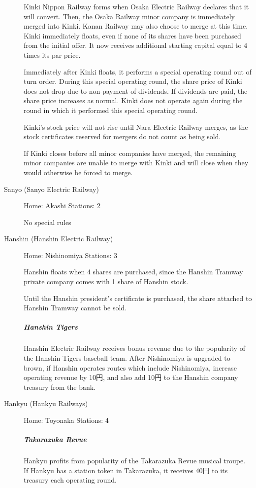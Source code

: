 \begin{multicols}{2}
\begin{description}
Kinki Nippon Railway forms when Osaka Electric Railway declares that
it will convert. Then, the Osaka Railway minor company is immediately
merged into Kinki. Kanan Railway may also choose to merge at this
time. Kinki immediately floats, even if none of its shares have been
purchased from the initial offer. It now receives additional starting
capital equal to 4 times its par price.

Immediately after Kinki floats, it performs a special operating round
out of turn order. During this special operating round, the share
price of Kinki does not drop due to non-payment of dividends. If
dividends are paid, the share price increases as normal. Kinki does
not operate again during the round in which it performed this special
operating round.

Kinki's stock price will not rise until Nara Electric Railway merges,
as the stock certificates reserved for mergers do not count as being
sold.

If Kinki closes before all minor companies have merged, the remaining
minor companies are unable to merge with Kinki and will close when they would
otherwise be forced to merge.

\item[Sanyo (Sanyo Electric Railway)] \hfill

Home: Akashi \hfill Stations: 2

No special rules

\item[Hanshin (Hanshin Electric Railway)] \hfill

Home: Nishinomiya \hfill Stations: 3

Hanshin floats when 4 shares are purchased, since the Hanshin Tramway
private company comes with 1 share of Hanshin stock.

Until the Hanshin president's certificate is purchased, the share
attached to Hanshin Tramway cannot be sold.

\subparagraph{Hanshin Tigers}
Hanshin Electric Railway receives bonus revenue due to the popularity
of the Hanshin Tigers baseball team. After Nishinomiya is upgraded to
brown, if Hanshin operates routes which include Nishinomiya, increase
operating revenue by 10円, and also add 10円 to the Hanshin company
treasury from the bank.

\item[Hankyu (Hankyu Railways)] \hfill

Home: Toyonaka \hfill
Stations: 4

\subparagraph{Takarazuka Revue}
Hankyu profits from popularity of the Takarazuka Revue musical
troupe. If Hankyu has a station token in Takarazuka, it receives
40円 to its treasury each operating round.



\end{description}
\end{multicols}
